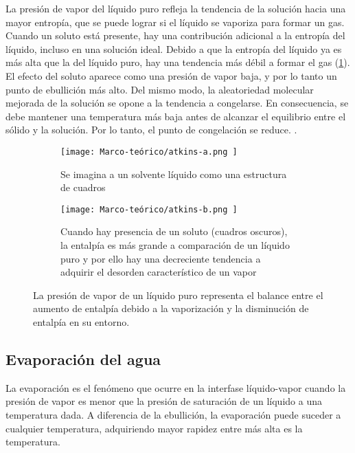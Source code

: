 			\begin{displayquote}
				La presión de vapor del líquido puro refleja la tendencia de la solución hacia una mayor entropía, que se puede lograr si el líquido se vaporiza para formar un gas. Cuando un soluto está presente, hay una contribución adicional a la entropía del líquido, incluso en una solución ideal. Debido a que la entropía del líquido ya es más alta que la del líquido puro, hay una tendencia más débil a formar el gas (\cref{fig:coligativas-pv}). El efecto del soluto aparece como una presión de vapor baja, y por lo tanto un punto de ebullición más alto. Del mismo modo, la aleatoriedad molecular mejorada de la solución se opone a la tendencia a congelarse. En consecuencia, se debe mantener una temperatura más baja antes de alcanzar el equilibrio entre el sólido y la solución. Por lo tanto, el punto de congelación se reduce. \cite{atkins_physical_2010}.
			\end{displayquote}
			\begin{figure}[H]
				\centering
				\begin{subfigure}[t]{0.45\linewidth}
					\centering
					\texttt{[image: 
						Marco-teórico/atkins-a.png
					]}
					\caption{Se imagina a un solvente líquido como una estructura de cuadros}
				\end{subfigure}
				\hfill
				\begin{subfigure}[t]{0.45\linewidth}
					\centering
					\texttt{[image: 
						Marco-teórico/atkins-b.png
					]}
					\caption{Cuando hay presencia de un soluto (cuadros oscuros), la entalpía es más grande a comparación de un líquido puro y por ello hay una decreciente tendencia a adquirir el desorden característico de un vapor}
				\end{subfigure}
				
				\caption{La presión de vapor de un líquido puro representa el balance entre el aumento de entalpía debido a la vaporización y la disminución de entalpía en su entorno.}
				\label{fig:coligativas-pv}
			\end{figure}
			
	\subsection{Evaporación del agua}
		
		La evaporación es el fenómeno que ocurre en la interfase líquido-vapor cuando la presión de vapor es menor que la presión de saturación de un líquido a una temperatura dada. A diferencia de la ebullición, la evaporación puede suceder a cualquier temperatura, adquiriendo mayor rapidez entre más alta es la temperatura. \cite{cengel_transferencia_2010}

